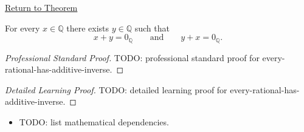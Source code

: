 \newpage
{}
\label{prf:every-rational-has-additive-inverse}

\begin{remark*}[Return]
\hyperref[thm:every-rational-has-additive-inverse]{Return to Theorem}
\end{remark*}

\begin{theorem*}
For every $x\in\mathbb{Q}$ there exists $y\in\mathbb{Q}$ such that
\[
x+y=0_{\mathbb{Q}}
\qquad\text{and}\qquad
y+x=0_{\mathbb{Q}}.
\]
\end{theorem*}

\begin{proof}[Professional Standard Proof]
\LRAProofBodyStart
TODO: professional standard proof for every-rational-has-additive-inverse.
\end{proof}

\begin{proof}[Detailed Learning Proof]
\LRAProofBodyStart
TODO: detailed learning proof for every-rational-has-additive-inverse.
\end{proof}

\begin{remark*}
\end{remark*}

\begin{dependencies}
\begin{itemize}
  \item TODO: list mathematical dependencies.
\end{itemize}
\end{dependencies}

\clearpage
